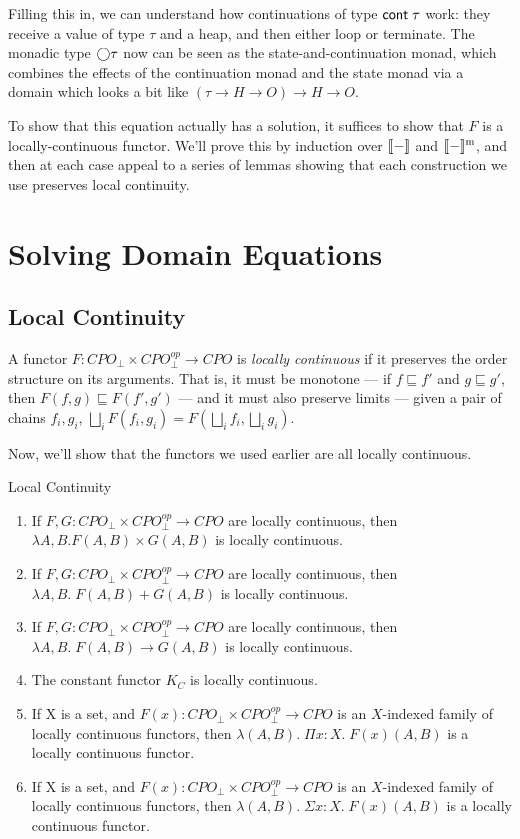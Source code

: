 Filling this in, we can understand how continuations of type
$\mathsf{cont}\;{\tau}$ work: they receive a value of type $\tau$ and a heap,
and then either loop or terminate. The monadic type $\bigcirc{\tau}$ now
can be seen as the state-and-continuation monad, which combines the
effects of the continuation monad and the state monad via a domain 
which looks a bit like $(\tau \to H \to O) \to H \to O$. 

To show that this equation actually has a solution, it suffices to 
show that $F$ is a locally-continuous functor. We'll prove this by 
induction over $[\![{-}]\!]$ and $[\![{-}]\!]^{\mathrm{m}}$, and then at each
case appeal to a series of lemmas showing that each construction we
use preserves local continuity. 

\section{Solving Domain Equations}

\subsection{Local Continuity}

A functor $F : CPO_\bot \times CPO^{op}_\bot \to CPO$ is \emph{locally
  continuous} if it preserves the order structure on its arguments.
That is, it must be monotone --- if $f \sqsubseteq f'$ and $g
\sqsubseteq g'$, then $F(f, g) \sqsubseteq F(f', g')$ --- and it
must also preserve limits --- given a pair of chains $f_i, g_i$, 
$\bigsqcup_i F(f_i, g_i) = F(\bigsqcup_i f_i, \bigsqcup_i g_i)$. 

Now, we'll show that the functors we used earlier are all locally 
continuous. 

\begin{lemma}{Local Continuity}
\begin{enumerate}
\item If $F,G : CPO_\bot \times CPO^{op}_\bot \to CPO$ are locally continuous,
      then $\lambda A,B. F(A,B) \times G(A,B)$ is locally continuous.  
\item If $F,G : CPO_\bot \times CPO^{op}_\bot \to CPO$ are locally continuous,
      then $\lambda A,B.\; F(A,B) + G(A,B)$ is locally continuous.  
\item If $F,G : CPO_\bot \times CPO^{op}_\bot \to CPO$ are locally continuous,
      then $\lambda A,B.\;F(A,B) \to G(A,B)$ is locally continuous.  
\item The constant functor $K_C$ is locally continuous. 
\item If X is a set, and $F(x) : CPO_\bot \times CPO^{op}_\bot \to CPO$ is an
      $X$-indexed family of locally continuous functors, then 
      $\lambda (A,B).\; \Pi x:X.\;F(x)(A,B)$ is a locally continuous functor. 
\item If X is a set, and $F(x) : CPO_\bot \times CPO^{op}_\bot \to CPO$ is an
      $X$-indexed family of locally continuous functors, then 
      $\lambda (A,B).\;\Sigma x:X.\;F(x)(A,B)$ is a locally continuous functor. 
\end{enumerate}
\end{lemma}
 
